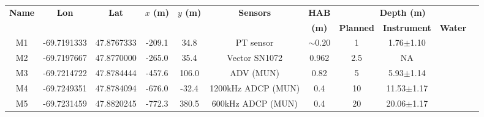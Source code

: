 \documentclass[letterpaper,10pt,landscape]{article}
\begin{document}
\thispagestyle{empty}

  \begin{table}
    \centering
    \begin{tabular}{|c|c|c|c|c|c|c|c|c|c|c|}
      \hline
      {\bf Name}         & {\bf Lon}                    & {\bf Lat}                   & {\bf $x$ (m)}             & {\bf $y$ (m)}           & {\bf Sensors}      & {\bf HAB}  & \multicolumn{3}{|c|}{{\bf Depth (m)}} \\
                 &                              &                             &                           &                         &                    & {\bf (m)}  & {\bf Planned}       & {\bf Instrument}  & {\bf Water} \\
                                                                                                                                                                                                                          
      \hline \hline                                                                                                                                                                                                       
                                                                                                                                                                                                                          
      M1                  & -69.7191333                  & 47.8767333                  & -209.1                    & 34.8                    & PT sensor          & $\sim0.20$ & 1                   & 1.76$\pm$1.10     & \\ \hline
      M2                  & -69.7197667                  & 47.8770000                  & -265.0                    & 35.4                    & Vector SN1072      & 0.962      & 2.5                 & NA                & \\ \hline
      M3                  & -69.7214722                  & 47.8784444                  & -457.6                    & 106.0                   & ADV (MUN)          & 0.82       & 5                   & 5.93$\pm$1.14     & \\ \hline
      M4                  & -69.7249351                  & 47.8784094                  & -676.0                    & -32.4                   & 1200kHz ADCP (MUN) & 0.4        & 10                  & 11.53$\pm$1.17    & \\ \hline
      M5                  & -69.7231459                  & 47.8820245                  & -772.3                    & 380.5                   & 600kHz ADCP (MUN)  & 0.4        & 20                  & 20.06$\pm$1.17    & \\ \hline
                                                                                                                                                                                                                          

\end{tabular}
\end{table}
\end{document}
